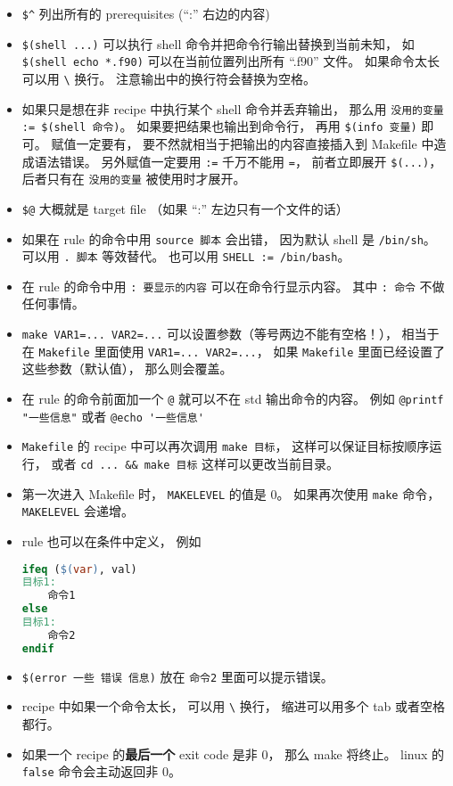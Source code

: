 \begin{itemize}
\item \verb`$^` 列出所有的 prerequisites (“:” 右边的内容)
\item \verb`$(shell ...)` 可以执行 shell 命令并把命令行输出替换到当前未知， 如 \verb`$(shell echo *.f90)` 可以在当前位置列出所有 “.f90” 文件。 如果命令太长可以用 \verb`\` 换行。 注意输出中的换行符会替换为空格。
\item 如果只是想在非 recipe 中执行某个 shell 命令并丢弃输出， 那么用 \verb`没用的变量 := $(shell 命令)`。  如果要把结果也输出到命令行， 再用 \verb`$(info 变量)` 即可。 赋值一定要有， 要不然就相当于把输出的内容直接插入到 Makefile 中造成语法错误。 另外赋值一定要用 \verb`:=` 千万不能用 \verb`=`， 前者立即展开 \verb`$(...)`， 后者只有在 \verb`没用的变量` 被使用时才展开。
\item \verb`$@` 大概就是 target file （如果 “:” 左边只有一个文件的话）
\item 如果在 rule 的命令中用 \verb`source 脚本` 会出错， 因为默认 shell 是 \verb`/bin/sh`。 可以用 \verb`. 脚本` 等效替代。 也可以用 \verb`SHELL := /bin/bash`。
\item 在 rule 的命令中用 \verb`: 要显示的内容` 可以在命令行显示内容。 其中 \verb`: 命令` 不做任何事情。
\item \verb`make VAR1=... VAR2=...` 可以设置参数（等号两边不能有空格！）， 相当于在 \verb`Makefile` 里面使用 \verb`VAR1=... VAR2=...`， 如果 \verb`Makefile` 里面已经设置了这些参数（默认值）， 那么则会覆盖。 
\item 在 rule 的命令前面加一个 \verb`@` 就可以不在 std 输出命令的内容。 例如 \verb`@printf "一些信息"` 或者 \verb`@echo '一些信息'`
\item \verb`Makefile` 的 recipe 中可以再次调用 \verb`make 目标`， 这样可以保证目标按顺序运行， 或者 \verb`cd ... && make 目标` 这样可以更改当前目录。
\item 第一次进入 Makefile 时， \verb`MAKELEVEL` 的值是 0。 如果再次使用 \verb`make` 命令， \verb`MAKELEVEL` 会递增。
\item rule 也可以在条件中定义， 例如
\begin{lstlisting}[language=makefile]
ifeq ($(var), val)
目标1:
	命令1
else
目标1:
	命令2
endif
\end{lstlisting}
\item \verb`$(error 一些 错误 信息)` 放在 \verb`命令2` 里面可以提示错误。
\item recipe 中如果一个命令太长， 可以用 \verb`\` 换行， 缩进可以用多个 tab 或者空格都行。
\item 如果一个 recipe 的\textbf{最后一个} exit code 是非 0， 那么 make 将终止。 linux 的 \verb`false` 命令会主动返回非 0。
\end{itemize}

